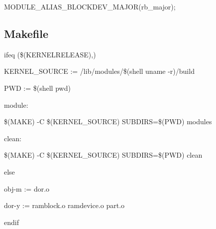 \documentclass[11pt]{article}
\begin{document}
MODULE\_ALIAS\_BLOCKDEV\_MAJOR(rb\_major);

\subsection{Makefile}

ifeq (\$(KERNELRELEASE),)

	KERNEL\_SOURCE := /lib/modules/\$(shell uname -r)/build
	
	PWD := \$(shell pwd)

module:

	\$(MAKE) -C \$(KERNEL\_SOURCE) SUBDIRS=\$(PWD) modules

clean:

	\$(MAKE) -C \$(KERNEL\_SOURCE) SUBDIRS=\$(PWD) clean


else

	obj-m := dor.o
	
	dor-y := ramblock.o ramdevice.o part.o

endif
\end{document}
